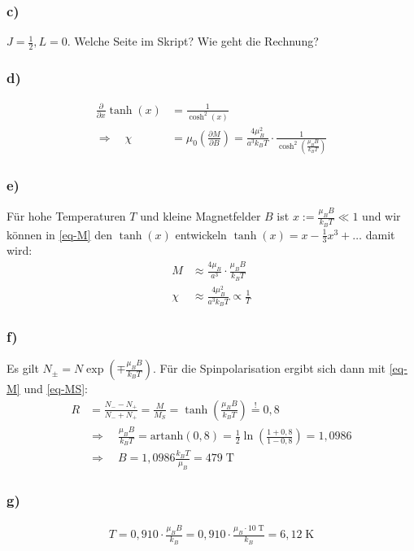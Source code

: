 \subsubsection*{c)}
$J = \frac{1}{2}, L = 0$. Welche Seite im Skript? Wie geht die Rechnung?

\subsubsection*{d)}
\begin{align*}
  \frac{\partial}{\partial x} \tanh(x) &= \frac{1}{\cosh^2 (x)} \\
  \Rightarrow \quad \chi &= \mu_0 \left(\frac{\partial M}{\partial B}\right) =
  \frac{4 \mu_B^2}{a^3 k_B T} \cdot \frac{1}{\cosh^2\left(\frac{\mu_B B}{k_B T}\right)}
\end{align*}

\subsubsection*{e)}
Für hohe Temperaturen $T$ und kleine Magnetfelder $B$ ist $x := \frac{\mu_B B}{k_B T} \ll 1$
und wir können in \eqref{eq-M} den $\tanh(x)$ entwickeln $\tanh(x) = x - \frac{1}{3}x^3 + \dots$ damit wird:
\begin{align*}
  M &\approx \frac{4 \mu_B}{a^3} \cdot \frac{\mu_B B}{k_B T}\\
  \chi &\approx \frac{4 \mu_B^2}{a^3 k_B T} \propto \frac{1}{T}
\end{align*}

\subsubsection*{f)}
Es gilt $N_\pm = N \exp\left(\mp \frac{\mu_B B}{k_B T}\right)$.
Für die Spinpolarisation ergibt sich dann mit \eqref{eq-M} und \eqref{eq-MS}:
\begin{align*}
  R &=  \frac{N_- - N_+}{N_- + N_+} = \frac{M}{M_S} = \tanh \left(\frac{\mu_B B}{k_B T}\right) \overset{!} = 0{,}8 \\
  & \Rightarrow \quad \frac{\mu_B B}{k_B T} = \mathrm{artanh} (0{,}8) =
  \frac{1}{2} \ln \left(\frac{1 + 0{,}8}{1 - 0{,}8}\right) = 1{,}0986 \\
  & \Rightarrow \quad B = 1{,}0986 \frac{k_B T}{\mu_B} = 479\;\text{T}
\end{align*}

\subsubsection*{g)}
\begin{align*}
  T = 0{,}910 \cdot \frac{\mu_B B}{k_B} = 0{,}910 \cdot \frac{\mu_B \cdot 10\;\text{T} }{k_B}
  = 6{,}12\;\text{K}
\end{align*}
